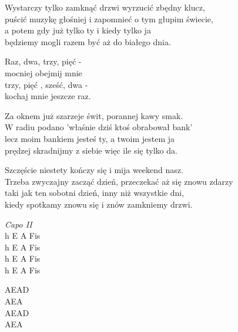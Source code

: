 \begin{text}
    \small{
    \hfill\break
    Wystarczy tylko zamknąć drzwi wyrzucić zbędny klucz,\\
    puścić muzykę głośniej i zapomnieć o tym głupim świecie,\\
    a potem gdy już tylko ty i kiedy tylko ja\\
    będziemy mogli razem być aż do białego dnia.

    Raz, dwa, trzy, pięć - \\
    mocniej obejmij mnie\\
    trzy, pięć , sześć, dwa -\\
    kochaj mnie jeszcze raz.

    Za oknem już szarzeje świt, porannej kawy smak.\\
    W radiu podano 'właśnie dziś ktoś obrabował bank'\\
    lecz moim bankiem jesteś ty, a twoim jestem ja\\
    prędzej skradnijmy z siebie więc ile się tylko da.

    Szczęście niestety kończy się i mija weekend nasz.\\
    Trzeba zwyczajny zacząć dzień, przeczekać aż się znowu zdarzy\\
    taki jak ten sobotni dzień, inny niż wszystkie dni,\\
    kiedy spotkamy znowu się i znów zamkniemy drzwi.
    }
\end{text}
\begin{chord}
    \small{
    \textit{Capo II}\\
    h E A Fis\\
    h E A Fis\\
    h E A Fis\\
    h E A Fis

    AEAD\\
    AEA\\
    AEAD\\
    AEA
    }
\end{chord}